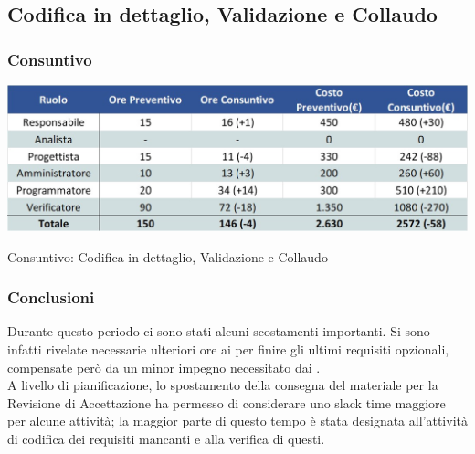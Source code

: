 \newpage
\subsection{Codifica in dettaglio, Validazione e Collaudo} \label{ConsuntivoPeriodoCodificaValidazioneCollaudo}
\subsubsection{Consuntivo}
\begin{table}[h!]
	\centerline{\includegraphics[scale=0.55]{img/Preventivo/Consuntivo/CodificaValidazioneCollaudoConsuntivo.jpg}}
	\caption{Consuntivo: Codifica in dettaglio, Validazione e Collaudo}
\end{table}
\subsubsection{Conclusioni}
Durante questo periodo ci sono stati alcuni scostamenti importanti. Si sono infatti rivelate necessarie ulteriori ore ai \progrs{} per finire gli ultimi requisiti opzionali, compensate però da un minor impegno necessitato dai \vers{}. \\
A livello di pianificazione, lo spostamento della consegna del materiale per la Revisione di Accettazione ha permesso di considerare uno slack time maggiore per alcune attività; la maggior parte di questo tempo è stata designata all'attività di codifica dei requisiti mancanti e alla verifica di questi.